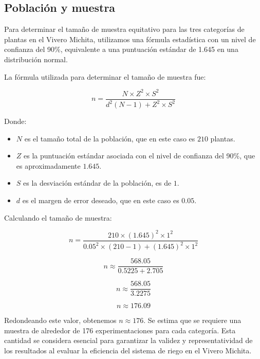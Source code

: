 
\subsection{Población y muestra}

Para determinar el tamaño de muestra equitativo para las tres categorías de plantas en el Vivero Michita, utilizamos una fórmula estadística con un nivel de confianza del 90\%, equivalente a una puntuación estándar de 1.645 en una distribución normal.

La fórmula utilizada para determinar el tamaño de muestra fue:

\[ n = \frac{N \times Z^2 \times S^2}{d^2 (N-1) + Z^2 \times S^2} \]

Donde:
\begin{itemize}
     \item $N$ es el tamaño total de la población, que en este caso es $210$ plantas.
     \item $Z$ es la puntuación estándar asociada con el nivel de confianza del 90\%, que es aproximadamente $1.645$.
     \item $S$ es la desviación estándar de la población, es de $1$.
     \item $d$ es el margen de error deseado, que en este caso es $0.05$.
\end{itemize}

Calculando el tamaño de muestra:

\[ n = \frac{210 \times (1.645)^2 \times 1^2}{0.05^2 \times (210-1) + (1.645)^2 \times 1^2} \]

\[ n \approx \frac{568.05}{0.5225 + 2.705} \]

\[ n \approx \frac{568.05}{3.2275} \]

\[ n \approx 176.09 \]

Redondeando este valor, obtenemos $n \approx 176$. Se estima que se requiere una muestra de alrededor de 176 experimentaciones para cada categoría. Esta cantidad se considera esencial para garantizar la validez y representatividad de los resultados al evaluar la eficiencia del sistema de riego en el Vivero Michita.
